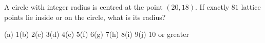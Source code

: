 A circle with integer radius is centred at the point $(20,18)$. If exactly $81$ lattice points lie inside or on the circle, what is its radius?

(a) $1$\quad (b) $2$\quad (c) $3$\quad (d) $4$\quad (e) $5$\quad (f) $6$\quad (g) $7$\quad (h) $8$\quad (i) $9$\quad (j) $10$ or greater
